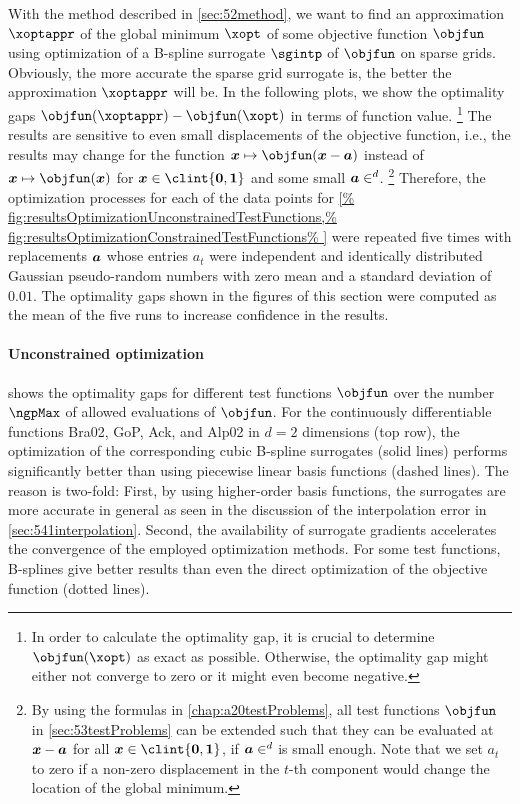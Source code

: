 With the method described in \cref{sec:52method},
we want to find an approximation $\xoptappr$ of the
global minimum $\xopt$ of some objective function $\objfun$
using optimization of a B-spline surrogate $\sgintp$ of $\objfun$
on sparse grids.
Obviously, the more accurate the sparse grid surrogate is,
the better the approximation $\xoptappr$ will be.
In the following plots,
we show the optimality gaps $\objfun(\xoptappr) - \objfun(\xopt)$
in terms of function value.%
\footnote{%
  In order to calculate the optimality gap,
  it is crucial to determine $\objfun(\xopt)$ as exact as possible.
  Otherwise, the optimality gap might either not converge to zero
  or it might even become negative.%
}
The results are sensitive to even small displacements
of the objective function, i.e.,
the results may change for the
function $\*x \mapsto \objfun(\*x - \*a)$
instead of $\*x \mapsto \objfun(\*x)$ for $\*x \in \clint{\*0, \*1}$
and some small $\*a \in \real^d$.%
\footnote{%
  By using the formulas in \cref{chap:a20testProblems},
  all test functions $\objfun$ in \cref{sec:53testProblems}
  can be extended such that they can be evaluated at ${\boldsymbol{x}} - {\boldsymbol{a}}$
  for all $\*x \in \clint{\*0, \*1}$, if $\*a \in \real^d$ is small enough.
  Note that we set $a_t$ to zero if a non-zero displacement in
  the $t$-th component would change the location of the global minimum.%
}
Therefore, the optimization processes for each of the
data points for \cref{%
  fig:resultsOptimizationUnconstrainedTestFunctions,%
  fig:resultsOptimizationConstrainedTestFunctions%
}
were repeated five times with replacements ${\boldsymbol{a}}$
whose entries $a_t$ were independent and identically distributed Gaussian
pseudo-random numbers with zero mean and a standard deviation of $0.01$.
The optimality gaps shown in the figures of this section were computed
as the mean of the five runs to increase confidence in the results.

\paragraph{Unconstrained optimization}

shows the optimality gaps for different test functions $\objfun$
over the number $\ngpMax$ of allowed evaluations of $\objfun$.
For the continuously differentiable functions Bra02, GoP, Ack, and Alp02
in $d = 2$ dimensions (top row),
the optimization of the corresponding cubic B-spline surrogates (solid lines)
performs significantly better than using piecewise linear basis functions
(dashed lines).
The reason is two-fold:
First, by using higher-order basis functions, the surrogates are more accurate
in general as seen in the discussion of the interpolation error in
\cref{sec:541interpolation}.
Second, the availability of surrogate gradients accelerates the
convergence of the employed optimization methods.
For some test functions, B-splines give better results than even
the direct optimization of the objective function (dotted lines).

